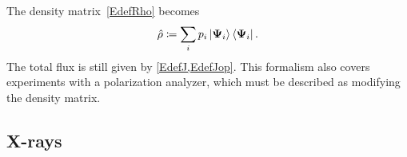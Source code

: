 The density matrix~\cref{EdefRho} becomes
\begin{equation}\label{EdefRhoSpinor}
  \hat\rho \coloneqq \sum_i p_i \ket{\mathbf{\Psi}_i}\bra{\mathbf{\Psi}_i}.
\end{equation}
The total flux is still given by \cref{EdefJ,EdefJop}.
This formalism also covers experiments with a polarization analyzer,
%
which must be described as modifying the density matrix.
%
%
%

%
%

\subsection{X-rays}\label{SXwave}

%
%

